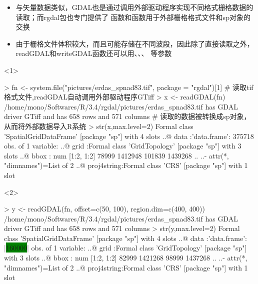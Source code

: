 \begin{frame}[t,fragile]{\subsecname}{\subsubsecname}
\begin{itemize} 
\item<1-> 与矢量数据类似，GDAL也是通过调用外部驱动程序实现不同格式栅格数据的读取；而rgdal包也专门提供了
函数和函数用于外部栅格格式文件和sp对象的交换
\item<2-> 由于栅格文件体积较大，而且可能存储在不同波段，因此除了直接读取之外，
readGDAL和writeGDAL函数还可以用、、、
等参数
\end{itemize}

\begin{overlayarea}{\textwidth}{\textheight}
\begin{onlyenv}<1>
\begin{rcode}
> fn <- system.file("pictures/erdas_spnad83.tif", package = "rgdal")[1]
# 读取tif格式文件,readGDAL自动调用外部驱动程序GTiff
> x <- readGDAL(fn)
/home/mono/Softwares/R/3.4/rgdal/pictures/erdas_spnad83.tif has GDAL driver GTiff 
and has 658 rows and 571 columns
# 读取的数据被转换成sp对象，从而将外部数据导入R系统
> str(x,max.level=2)
Formal class 'SpatialGridDataFrame' [package "sp"] with 4 slots
  ..@ data       :'data.frame': 375718 obs. of  1 variable:
  ..@ grid       :Formal class 'GridTopology' [package "sp"] with 3 slots
  ..@ bbox       : num [1:2, 1:2] 78999 1412948 101839 1439268
  .. ..- attr(*, "dimnames")=List of 2
  ..@ proj4string:Formal class 'CRS' [package "sp"] with 1 slot
\end{rcode}
\end{onlyenv}

\begin{onlyenv}<2>
\begin{rcode}
> y <- readGDAL(fn, offset=c(50, 100), region.dim=c(400, 400))
/home/mono/Softwares/R/3.4/rgdal/pictures/erdas_spnad83.tif has GDAL driver GTiff 
and has 658 rows and 571 columns
> str(y,max.level=2)
Formal class 'SpatialGridDataFrame' [package "sp"] with 4 slots
  ..@ data       :'data.frame': |\colorbox{green}{160000}| obs. of  1 variable:
  ..@ grid       :Formal class 'GridTopology' [package "sp"] with 3 slots
  ..@ bbox       : num [1:2, 1:2] 82999 1421268 98999 1437268
  .. ..- attr(*, "dimnames")=List of 2
  ..@ proj4string:Formal class 'CRS' [package "sp"] with 1 slot
\end{rcode}
\end{onlyenv}


\end{overlayarea}
\end{frame}
